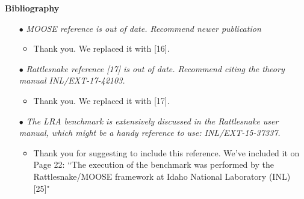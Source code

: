 \documentclass[11pt]{letter}
\newcommand{\section}[1]{\textbf{#1}}
\newcommand{\done}{$\bullet$}
\newcommand{\easy}[1]{{\textit{#1}}}
\begin{document}
\section{Bibliography}

\begin{itemize}

\item[\done] \easy{ MOOSE reference is out of date. Recommend newer publication }
\begin{itemize}
\item Thank you. We replaced it with [16].
\end{itemize}

\item[\done] \easy{ Rattlesnake reference [17] is out of date. Recommend citing the theory manual INL/EXT-17-42103. }
\begin{itemize}
\item Thank you. We replaced it with [17].
\end{itemize}

\item[\done] \easy{ The LRA benchmark is extensively discussed in the Rattlesnake user manual, which might be a handy reference to use: INL/EXT-15-37337. }
\begin{itemize}
\item Thank you for suggesting to include this reference. We've included it on Page 22: ``The execution of the benchmark was performed by the Rattlesnake/MOOSE framework at Idaho National Laboratory (INL) [25]"
\end{itemize}

\end{itemize}
\end{document}

